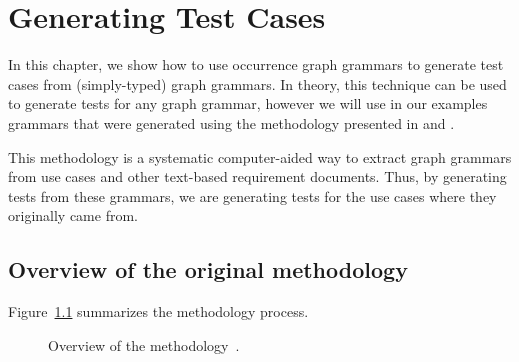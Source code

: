 \chapter{Generating Test Cases}\label{ch:tests}

In this chapter, we show how to use  occurrence graph grammars to generate  test cases from (simply-typed) graph grammars. In theory, this technique  can be used to generate tests for any graph grammar, however we will use in our examples grammars that were generated using the methodology presented in \cite{Junior2015} and \cite{BezerraWEIT2016}.

This methodology is a systematic computer-aided way to extract graph grammars from use
cases and other text-based requirement documents. Thus, by generating tests from these grammars, we are generating tests for the use cases where they originally came from.

\section{Overview of the original methodology}

Figure~\ref{fig:tests:methodology} summarizes the methodology process.

\begin{figure}[!ht]
  \centering
  \caption{Overview of the methodology~\cite{Junior2015}.}\label{fig:tests:methodology}
\end{figure}

